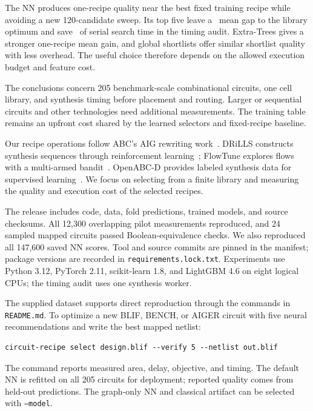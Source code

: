 \documentclass[11pt,a4paper]{article}
\newcommand{\op}[1]{\texttt{#1}}
\begin{document}
The NN produces one-recipe quality near the best fixed training recipe while avoiding a new 120-candidate sweep. Its top five leave a \NNFiveRegret\ mean gap to the library optimum and save \NNFiveSaved\ of serial search time in the timing audit. Extra-Trees gives a stronger one-recipe mean gain, and global shortlists offer similar shortlist quality with less overhead. The useful choice therefore depends on the allowed execution budget and feature cost.

The conclusions concern 205 benchmark-scale combinational circuits, one cell library, and synthesis timing before placement and routing. Larger or sequential circuits and other technologies need additional measurements. The training table remains an upfront cost shared by the learned selectors and fixed-recipe baseline.

Our recipe operations follow ABC's AIG rewriting work~\cite{mishchenko}. DRiLLS constructs synthesis sequences through reinforcement learning~\cite{drills}; FlowTune explores flows with a multi-armed bandit~\cite{flowtune}. OpenABC-D provides labeled synthesis data for supervised learning~\cite{openabc}. We focus on selecting from a finite library and measuring the quality and execution cost of the selected recipes.

The release includes code, data, fold predictions, trained models, and source checksums. All 12,300 overlapping pilot measurements reproduced, and 24 sampled mapped circuits passed Boolean-equivalence checks. We also reproduced all 147,600 saved NN scores. Tool and source commits are pinned in the manifest; package versions are recorded in \op{requirements.lock.txt}. Experiments use Python 3.12, PyTorch 2.11, scikit-learn 1.8, and LightGBM 4.6 on eight logical CPUs; the timing audit uses one synthesis worker.

The supplied dataset supports direct reproduction through the commands in \op{README.md}. To optimize a new BLIF, BENCH, or AIGER circuit with five neural recommendations and write the best mapped netlist:
\begin{verbatim}
circuit-recipe select design.blif --verify 5 --netlist out.blif
\end{verbatim}
The command reports measured area, delay, objective, and timing. The default NN is refitted on all 205 circuits for deployment; reported quality comes from held-out predictions. The graph-only NN and classical artifact can be selected with \op{--model}.
\end{document}
